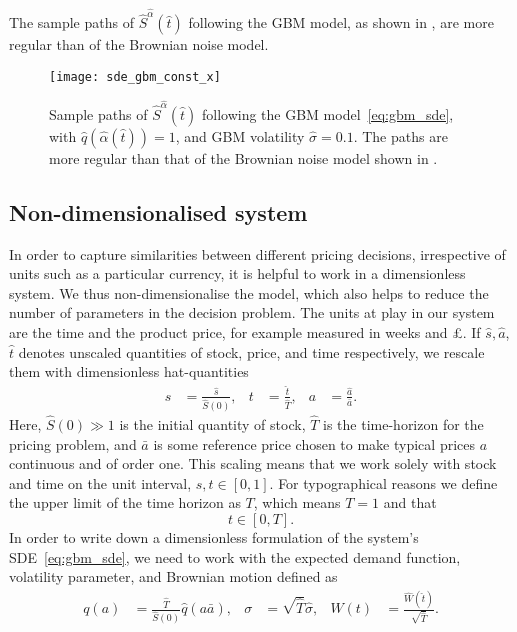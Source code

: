 \documentclass[main.tex]{subfiles}
\begin{document}
The sample paths of $\hat{S}^{\hat{\alpha}}(\hat{t})$ following the GBM model, as shown in
, are more regular
than of the Brownian noise model.
\begin{figure}[ht]
  \centering
  \texttt{[image: sde\_gbm\_const\_x]}
  \caption[Sample paths of stock following the GBM model]{Sample paths of $\hat{S}^{\hat{\alpha}}(\hat{t})$ following the GBM
    model~\eqref{eq:gbm_sde}, with $\hat{q}(\hat{\alpha}(\hat{t}))=1$, and GBM volatility
    $\hat{\sigma} = 0.1$. The paths are  more regular than that of the
    Brownian noise model shown in .
  }\label{fig:sde_gbm_const_x}
\end{figure}

\subsection{Non-dimensionalised system}\label{subsec:nondimensionalisation}
In order to capture similarities between different pricing decisions, irrespective of units
such as a particular currency, it is helpful to work in a dimensionless system.
We thus non-dimensionalise the model, which also helps to reduce the
number of parameters in the decision problem.
The units at play in our system are the time and the product price,
for example measured in weeks and \pounds.
If $\hat{s},\hat{a}$, $\hat{t}$ denotes unscaled quantities of stock, price, and
time respectively, we rescale them with dimensionless hat-quantities
\begin{align}
  s&=\frac{\hat{s}}{\hat{S}(0)},&t &=\frac{\hat{t}}{\hat{T}},
  &a &= \frac{\hat{a}}{\bar{a}}.
\end{align}
Here, $\hat{S}(0)\gg 1$ is the initial quantity of stock, $\hat{T}$ is the time-horizon
for the pricing problem, and $\bar{a}$ is some reference price chosen
to make typical prices $a$ continuous and of order one.
This scaling means that we work solely with stock and time on the unit
interval, $s,t\in[0,1]$.
For typographical reasons we define the upper limit of the time
horizon as $T$, which means $T=1$ and that
\begin{equation}
  t\in[0,T].
\end{equation}
In order to write down a dimensionless formulation of the system's
SDE~\eqref{eq:gbm_sde}, we need to work with the expected demand
function, volatility parameter, and Brownian motion defined as
\begin{align}
  q(a)&=\frac{\hat{T}}{\hat{S}(0)}\hat{q}(a \bar{a}),
  &\sigma &= \sqrt{\hat{T}}\hat{\sigma},
  &W(t) &= \frac{\hat{W}(\hat{t})}{ \sqrt{\hat{T}}}.
\end{align}
\end{document}
